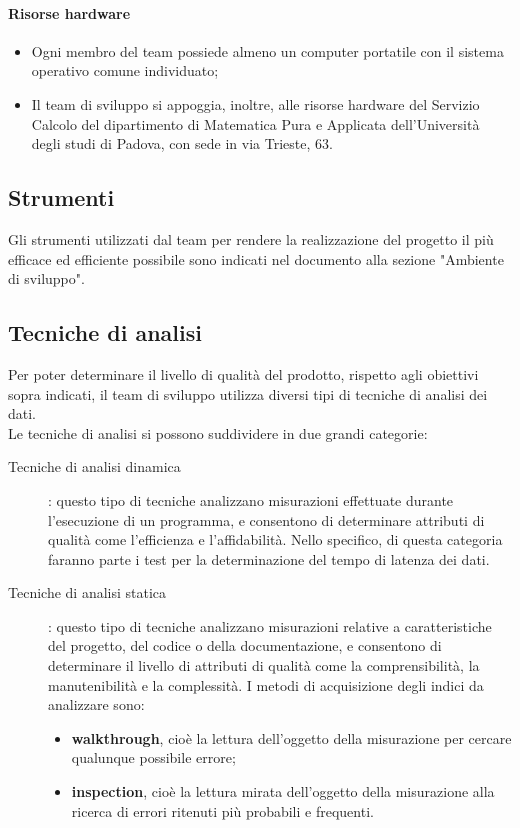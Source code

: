 		\paragraph{Risorse hardware}
			\begin{itemize}
				\item Ogni membro del team possiede almeno un computer portatile con il sistema operativo comune individuato;
				\item Il team di sviluppo si appoggia, inoltre, alle risorse hardware del Servizio Calcolo del dipartimento di Matematica Pura e Applicata dell'Università degli studi di Padova, con sede in via Trieste, 63.
			\end{itemize}
		\subsection{Strumenti}
		Gli strumenti utilizzati dal team per rendere la realizzazione del progetto il più efficace ed efficiente possibile sono indicati nel documento  alla sezione "Ambiente di sviluppo".
		\subsection{Tecniche di analisi}
		Per poter determinare il livello di qualità del prodotto, rispetto agli obiettivi sopra indicati, il team di sviluppo utilizza diversi tipi di tecniche di analisi dei dati.\\
		Le tecniche di analisi si possono suddividere in due grandi categorie:
		\begin{description}
			\item[Tecniche di analisi dinamica]: questo tipo di tecniche analizzano misurazioni effettuate durante l'esecuzione di un programma, e consentono di determinare attributi di qualità come l'efficienza e l'affidabilità. Nello specifico, di questa categoria faranno parte i test per la determinazione del tempo di latenza dei dati.
			\item [Tecniche di analisi statica]: questo tipo di tecniche analizzano misurazioni relative a caratteristiche del progetto, del codice o della documentazione, e consentono di determinare il livello di attributi di qualità come la comprensibilità, la manutenibilità e la complessità. I metodi di acquisizione degli indici da analizzare sono:
			\begin{itemize}
				\item \textbf{walkthrough}, cioè la lettura dell'oggetto della misurazione per cercare qualunque possibile errore;
				\item \textbf{inspection}, cioè la lettura mirata dell'oggetto della misurazione alla ricerca di errori ritenuti più probabili e frequenti.
			\end{itemize}
		\end{description}

